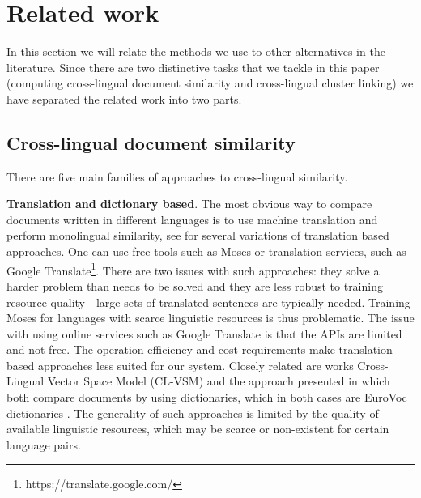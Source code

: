 \documentclass[twoside,11pt]{article}
\begin{document}
\section{Related work}

In this section we will relate the methods we use to other alternatives in the literature. Since there are two distinctive tasks that we tackle in this paper (computing cross-lingual document similarity and cross-lingual cluster linking) we have separated the related work into two parts.

\subsection{Cross-lingual document similarity}

There are five main families of approaches to cross-lingual similarity.

\textbf{Translation and dictionary based}. The most obvious way to compare documents written in different languages is to use machine translation and perform monolingual similarity, see  \cite{multilingualBook}\cite{plagiarism} for several variations of translation based approaches. One can use free tools such as Moses  or translation services, such as Google Translate\footnote{https://translate.google.com/}. There are two issues with such approaches: they solve a harder problem than needs to be solved and they are less robust to training resource quality - large sets of translated sentences are typically needed. Training Moses for languages with scarce linguistic resources is thus problematic. The issue with using online services such as Google Translate is that the APIs are limited and not free. The operation efficiency and cost requirements make translation-based approaches less suited for our system. Closely related are works Cross-Lingual Vector Space Model (CL-VSM) \cite{plagiarism} and the approach presented in \cite{pouliquen2008story} which both compare documents by using dictionaries, which in both cases are EuroVoc dictionaries \cite{eurovoc}. The generality of such approaches is limited by the quality of available linguistic resources, which may be scarce or non-existent for certain language pairs.
\end{document}
